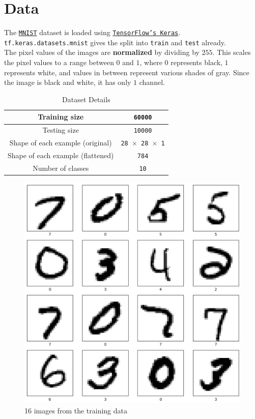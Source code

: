 
\section{Data}

The \href{https://en.wikipedia.org/wiki/MNIST_database}{\texttt{MNIST}} dataset is loaded using \href{https://www.tensorflow.org/api_docs/python/tf/keras/datasets/mnist/load_data}{\texttt{TensorFlow’s Keras}}.
\verb|tf.keras.datasets.mnist| gives the split into \verb|train| and \verb|test| already.\\
The pixel values of the images are \textbf{normalized} by dividing by $255$. This scales the pixel values to a range between $0$ and $1$, where $0$ represents black, $1$ represents white, and values in between represent various shades of gray. Since the image is black and white, it has only $1$ channel.

\begin{table}[h]
  \centering
  \begin{tabular}{|c|c|}
    \hline
    Training size & \texttt{60000}  \\
    \hline
    Testing size & \texttt{10000}   \\
    \hline
    Shape of each example (original)& \texttt{28 $\times$ 28 $\times$ 1} \\
    \hline
    Shape of each example (flattened)& \texttt{784} \\
    \hline
    Number of classes & \texttt{10}\\
    \hline
  \end{tabular}
  \caption{Dataset Details}
  
\end{table}




\begin{figure}[h!]
    \centering
    \includegraphics[width=0.8\linewidth]{images/data_visualization.png}
    \caption{16 images from the training data}
\end{figure}
